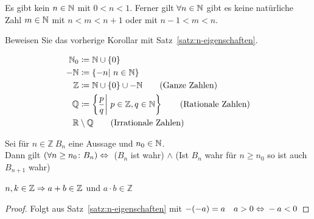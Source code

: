 \begin{korollar}
    \label{korollar:4.2.7}
    Es gibt kein $n\in\mathbb{N}$ mit $0<n<1$. Ferner gilt $\forall n\in\mathbb{N}$ gibt es keine natürliche Zahl $m\in\mathbb{N}$ mit $n<m<n+1$ oder mit $n-1<m<n$.
\end{korollar}
\begin{uebung}
    Beweisen Sie das vorherige Korollar mit Satz~\ref{satz:n-eigenschaften}.
\end{uebung}

\newpage

\begin{notation}[Zahlenmengen]
    \begin{align*}
        \mathbb{N}_0 &\coloneqq \mathbb{N}\cup\left\{0\right\}\\
        \mathbb{-N} &\coloneqq \left\{-n|~n\in\mathbb{N}\right\}\\
        \mathbb{Z} &\coloneqq \mathbb{N}\cup\left\{0\right\}\cup\mathbb{-N} \tag{Ganze Zahlen}\\
        \mathbb{Q} &\coloneqq\left\{\frac{p}{q}\middle|~p\in\mathbb{Z}, q\in\mathbb{N}\right\} \tag{Rationale Zahlen}\\
        \mathbb{R}&\setminus\mathbb{Q}\tag{Irrationale Zahlen}
    \end{align*}
\end{notation}
\begin{bemerkung}
    Sei für $n\in\mathbb{Z}~B_n$ eine Aussage und $n_0\in\mathbb{N}$.\\
    Dann gilt $\left(\forall n\geq n_0\colon B_n\right) \Leftrightarrow{}$ ($B_n$ ist wahr) $\land$ (Ist $B_n$ wahr für $n\geq n_0$ so ist auch $B_{n+1}$ wahr)
\end{bemerkung}

\begin{satz}
    $n,k\in\mathbb{Z} \Rightarrow{} a +b \in\mathbb{Z}$ und $a\cdot b \in\mathbb{Z}$
    \begin{proof}
        Folgt aus Satz~\ref{satz:n-eigenschaften} mit $-(-a) = a\quad a > 0 \Leftrightarrow{} -a < 0$
    \end{proof}
\end{satz}

